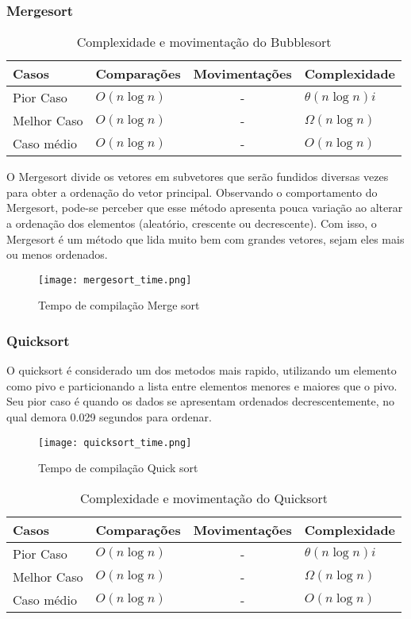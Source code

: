\documentclass[a4paper.12pt]{article}
\begin{document}
\subsubsection{Mergesort}


\begin{table}[!ht]
\centering
\caption{Complexidade e movimentação do Bubblesort}
\begin{tabular}{|l|l|c|l|}
\hline
Casos & Comparações & Movimentações & Complexidade\\
\hline
Pior Caso & $O(n \log{n})$ & - & $\theta(n\log{n})i$\\
\hline
Melhor Caso & $O(n \log{n})$ & - & $\Omega(n\log{n})$\\
\hline 
Caso médio & $O(n \log{n})$ & - & $O(n\log{n})$\\
\hline
\end{tabular}
\label{tab03}
\end{table}


O Mergesort divide os vetores em subvetores que serão fundidos diversas vezes para obter a ordenação do vetor principal. Observando o comportamento do Mergesort, pode-se perceber que esse método apresenta pouca variação ao alterar a ordenação dos elementos (aleatório, crescente ou decrescente). Com isso, o Mergesort é um método que lida muito bem com grandes vetores, sejam eles mais ou menos ordenados.


\begin{figure}[H]
    \centering
    \texttt{[image: mergesort\_time.png]}
    \caption{Tempo de compilação Merge sort}
    \label{figMerge}
\end{figure}


\subsubsection{Quicksort}
O quicksort é considerado um dos metodos mais rapido, utilizando um elemento como pivo e particionando a lista entre elementos menores e maiores que o pivo. Seu pior caso é quando os dados se apresentam ordenados decrescentemente, no qual demora 0.029 segundos para ordenar.

\begin{figure}[H]
    \centering
    \texttt{[image: quicksort\_time.png]}
    \caption{Tempo de compilação Quick sort}
    \label{figMerge}
\end{figure}

\begin{table}[!ht]
\centering
\caption{Complexidade e movimentação do Quicksort}
\begin{tabular}{|l|l|c|l|}
\hline
Casos & Comparações & Movimentações & Complexidade\\
\hline
Pior Caso & $O(n \log{n})$ & - & $\theta(n\log{n})i$\\
\hline
Melhor Caso & $O(n \log{n})$ & - & $\Omega(n\log{n})$\\
\hline 
Caso médio & $O(n \log{n})$ & - & $O(n\log{n})$\\
\hline
\end{tabular}
\label{tab03}
\end{table}
\end{document}

